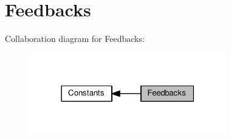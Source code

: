 \hypertarget{group__IL__CONST__FB}{}\section{Feedbacks}
\label{group__IL__CONST__FB}
Collaboration diagram for Feedbacks\+:\nopagebreak
\begin{figure}[H]
\begin{center}
\leavevmode
\includegraphics[width=243pt]{group__IL__CONST__FB}
\end{center}
\end{figure}
